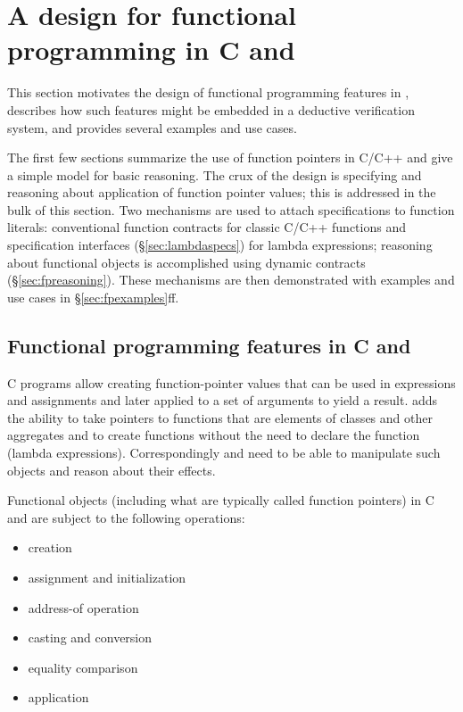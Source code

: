 \section{A design for functional programming in C and \lang}
\label{sec:functionalDiscussion}

This section motivates the design of functional programming features in \NAME, describes how such features might be embedded in a deductive verification system, and provides several examples and use cases.

The first few sections summarize the use of function pointers
in C/C++ and give a simple model for basic reasoning.
The crux of the design is specifying and reasoning about application of
function pointer values; this is addressed in the bulk of this
section.
Two mechanisms are used to attach specifications to function literals: conventional function contracts for classic C/C++ functions and
specification interfaces (\S\ref{sec:lambdaspecs}) for lambda expressions;
reasoning about functional objects is accomplished using
dynamic contracts (\S\ref{sec:fpreasoning}).
These mechanisms are then demonstrated with examples and use cases in \S\ref{sec:fpexamples}ff.


\subsection{Functional programming features in C and \lang}
\label{sec:fp}

C programs allow creating function-pointer values that
can be used in expressions and assignments and later applied
to a set of arguments to yield a result.
\lang adds
the	ability to take pointers to functions that are elements
of classes and other aggregates and to create functions
without the need to declare the function (lambda expressions).
Correspondingly \acsl and \NAME need to be able to manipulate such objects and reason about their effects.

Functional objects (including what are typically called function pointers) in C and \lang are subject to the following operations:
\begin{itemize}[noitemsep,nolistsep]
	\item creation
	\item assignment and initialization
	\item address-of operation
	\item casting and conversion
	\item equality comparison
	\item application
\end{itemize}

